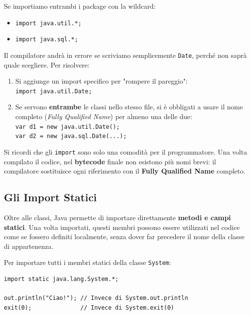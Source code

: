 \begin{example}
    Se importiamo entrambi i package con la wildcard:
    \begin{itemize}
        \item \texttt{import java.util.*;}
        \item \texttt{import java.sql.*;}
    \end{itemize}
    Il compilatore andrà in errore se scriviamo semplicemente \texttt{Date}, perché non saprà quale scegliere. Per risolvere:
    \begin{enumerate}
        \item Si aggiunge un import specifico per "rompere il pareggio": \\[2pt] \quad \texttt{import java.util.Date;}
        \item Se servono \textbf{entrambe} le classi nello stesso file, si è obbligati a usare il nome completo (\textit{Fully Qualified Name}) per almeno una delle due: \\
        \texttt{var d1 = new java.util.Date();} \\
        \texttt{var d2 = new java.sql.Date(...);}
    \end{enumerate}
\end{example}



\begin{observation}
    Si ricordi che gli \texttt{import} sono solo una comodità per il programmatore. Una volta compilato il codice, nel \textbf{bytecode} finale non esistono più nomi brevi: il compilatore sostituisce ogni riferimento con il \textbf{Fully Qualified Name} completo.
\end{observation}

\subsection{Gli Import Statici}

Oltre alle classi, Java permette di importare direttamente \textbf{metodi e campi statici}. Una volta importati, questi membri possono essere utilizzati nel codice come se fossero definiti localmente, senza dover far precedere il nome della classe di appartenenza.

\begin{example}[Sintassi]
Per importare tutti i membri statici della classe \texttt{System}:
\begin{lstlisting}
import static java.lang.System.*;

out.println("Ciao!"); // Invece di System.out.println
exit(0);              // Invece di System.exit(0)
\end{lstlisting}
\end{example}

